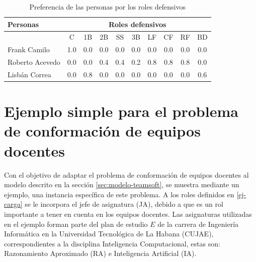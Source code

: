 \begin{table}[H]
		\centering
	\caption{Preferencia de las personas por los roles defensivos}\label{pref-rol-def-pel}
		\begin{tabular}{l | c c c c c c c c c }
			\toprule[1.7pt]
			\multicolumn{1}{l}{Personas} &        \multicolumn{9}{c}{Roles defensivos}            \\ \midrule
			& C   & 1B  & 2B  & SS  & 3B  & LF  & CF  & RF  & BD    \\ \cline{2-10}
			Frank Camilo                                               & 1.0 & 0.0 & 0.0 & 0.0 & 0.0 & 0.0 & 0.0 & 0.0 & 0.0  \\
			Roberto Acevedo                                            & 0.0 & 0.0 & 0.4 & 0.4 & 0.2 & 0.8 & 0.8 & 0.8 & 0.0  \\
			Lisbán Correa                                              & 0.0 & 0.8 & 0.0 & 0.0 & 0.0 & 0.0 & 0.0 & 0.0 & 0.6  \\
			\bottomrule[1pt]                              
		\end{tabular}
	
\end{table}


\section{Ejemplo simple para el problema de conformación de equipos docentes}

Con el objetivo de adaptar el problema de conformación de equipos docentes al modelo descrito en la sección \ref{sec:modelo-teamsoft}, se muestra mediante un ejemplo, una instancia específica de este problema. A los roles definidos en \ref{ej-carga} se le incorpora el jefe de asignatura (JA), debido a que es un rol importante a tener en cuenta en los equipos docentes. Las asignaturas utilizadas en el ejemplo forman parte del plan de estudio $E$ de la carrera de Ingeniería Informática en la Universidad Tecnológica de La Habana (CUJAE), correspondientes a la disciplina Inteligencia Computacional, estas son: Razonamiento Aproximado (RA) e Inteligencia Artificial (IA).

